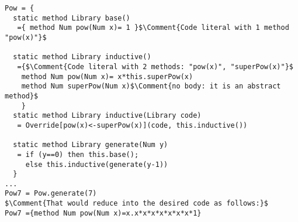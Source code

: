 \begin{lstlisting}
Pow = {
  static method Library base()
   ={ method Num pow(Num x)= 1 }$\Comment{Code literal with 1 method "pow(x)"}$

  static method Library inductive()
   ={$\Comment{Code literal with 2 methods: "pow(x)", "superPow(x)"}$
    method Num pow(Num x)= x*this.superPow(x)
    method Num superPow(Num x)$\Comment{no body: it is an abstract method}$
    }
  static method Library inductive(Library code)
   = Override[pow(x)<-superPow(x)](code, this.inductive())
  
  static method Library generate(Num y)
   = if (y==0) then this.base();
     else this.inductive(generate(y-1))
  }
...
Pow7 = Pow.generate(7)
$\Comment{That would reduce into the desired code as follows:}$
Pow7 ={method Num pow(Num x)=x.x*x*x*x*x*x*x*1}
\end{lstlisting}

